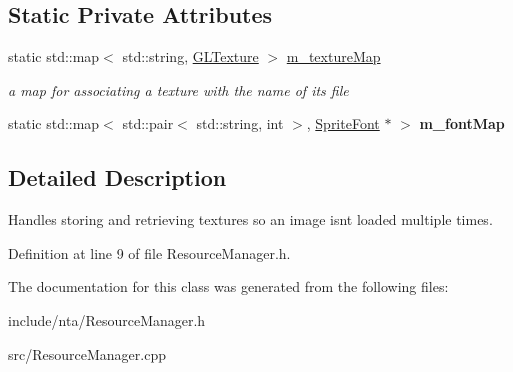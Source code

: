 \subsection*{Static Private Attributes}
\begin{DoxyCompactItemize}
\item 
\mbox{\label{classnta_1_1ResourceManager_abf9bb10402834f05b2673e0c1d8cb9aa}} 
static std\+::map$<$ std\+::string, \hyperlink{structnta_1_1GLTexture}{G\+L\+Texture} $>$ \hyperlink{classnta_1_1ResourceManager_abf9bb10402834f05b2673e0c1d8cb9aa}{m\+\_\+texture\+Map}
\begin{DoxyCompactList}\small\item\em a map for associating a texture with the name of its file \end{DoxyCompactList}\item 
\mbox{\label{classnta_1_1ResourceManager_ac6a87b69211ba52452b4c02847ea934e}} 
static std\+::map$<$ std\+::pair$<$ std\+::string, int $>$, \hyperlink{classnta_1_1SpriteFont}{Sprite\+Font} $\ast$ $>$ {\bfseries m\+\_\+font\+Map}
\end{DoxyCompactItemize}


\subsection{Detailed Description}
Handles storing and retrieving textures so an image isn\textquotesingle{}t loaded multiple times. 

Definition at line 9 of file Resource\+Manager.\+h.



The documentation for this class was generated from the following files\+:\begin{DoxyCompactItemize}
\item 
include/nta/Resource\+Manager.\+h\item 
src/Resource\+Manager.\+cpp\end{DoxyCompactItemize}
